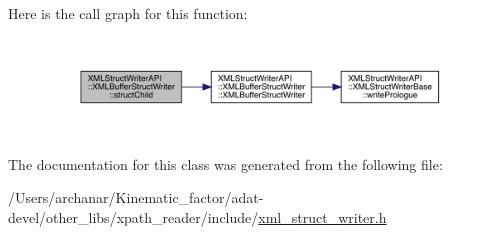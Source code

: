 Here is the call graph for this function\+:
\nopagebreak
\begin{figure}[H]
\begin{center}
\leavevmode
\includegraphics[width=350pt]{d2/d0a/classXMLStructWriterAPI_1_1XMLBufferStructWriter_a1c5689221a56527dfd86ac071db3a534_cgraph}
\end{center}
\end{figure}


The documentation for this class was generated from the following file\+:\begin{DoxyCompactItemize}
\item 
/\+Users/archanar/\+Kinematic\+\_\+factor/adat-\/devel/other\+\_\+libs/xpath\+\_\+reader/include/\mbox{\hyperlink{adat-devel_2other__libs_2xpath__reader_2include_2xml__struct__writer_8h}{xml\+\_\+struct\+\_\+writer.\+h}}\end{DoxyCompactItemize}
